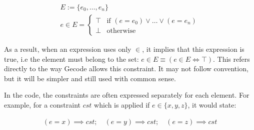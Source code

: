 \begin{equation}
    \begin{gathered}
        E := \{e_0, \dots, e_n\}\\
        e \in E = \begin{cases}
            \top & \text{if } (e = e_0) \lor \dots \lor (e = e_n)\\
            \bot & \text{otherwise}
        \end{cases}
    \end{gathered}
\end{equation}

As a result, when an expression uses only $\in$, it implies that this expression is true, i.e the element must belong to the set: $e \in E \equiv (e \in E \iff \top)$. This refers directly to the way Gecode allows this constraint. It may not follow convention, but it will be simpler and still used with common sense.

In the code, the constraints are often expressed separately for each element. For example, for a constraint $cst$ which is applied if $e \in \{x, y, z\}$, it would state:

\begin{equation*}
    \begin{gathered}
        (e = x) \implies cst;\quad (e = y) \implies cst;\quad (e = z) \implies cst
    \end{gathered}
\end{equation*}